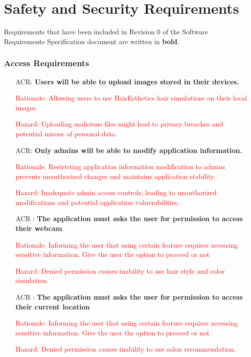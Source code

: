 \documentclass{article}
\newcounter{acrreqnum} %
\begin{document}
\section{Safety and Security Requirements}

Requirements that have been included in Revision 0 of the Software Requirements Specification document are written in \textbf{bold}. 

\subsubsection{Access Requirements}
\begin{itemize}
    \item[ACR\refstepcounter{acrreqnum}\theacrreqnum \label{R_Inputs}:] \textbf{Users will be able to upload images stored in their devices.}
    \item[] \textcolor{red}{Rationale: Allowing users to use HairEsthetics hair simulations on their local images.}
    \item[] \textcolor{red}{Hazard: Uploading malicious files might lead to privacy breaches and potential misuse of personal data.}
    
    \item[ACR\refstepcounter{acrreqnum}\theacrreqnum \label{R_Inputs}:]
    \textbf{Only admins will be able to modify application information.}
    \item[] \textcolor{red}{Rationale: Restricting application information modification to admins prevents unauthorized changes and maintains application stability.}
    \item[] \textcolor{red}{Hazard: Inadequate admin access controls, leading to unauthorized modifications and potential application vulnerabilities.}
    
    \item[ACR\refstepcounter{acrreqnum}\theacrreqnum
    \label{R_Inputs}:] 
    \textbf{The application must asks the user for permission to access their webcam }
    \item[] \textcolor{red}{Rationale: Informing the user that using certain feature requires accessing sensitive information. Give the user the option to proceed or not}
    \item[] \textcolor{red}{Hazard: Denied permission causes inability to use hair style and color simulation.}
    
    \item[ACR\refstepcounter{acrreqnum}\theacrreqnum
    \label{R_Inputs}:] 
    \textbf{The application must asks the user for permission to access their current location}
    \item[] \textcolor{red}{Rationale: Informing the user that using certain feature requires accessing sensitive information. Give the user the option to proceed or not}
    \item[] \textcolor{red}{Hazard: Denied permission causes inability to use salon recommendation.}
\end{itemize}
\end{document}

